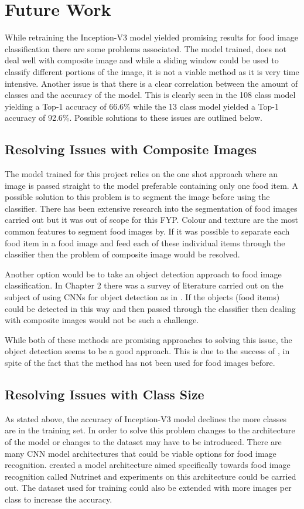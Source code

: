 

\section{Future Work}
While retraining the Inception-V3 model yielded promising results for food image classification there are some problems associated.
The model trained, does not deal well with composite image and while a sliding window could be used to classify different portions of the image, it is not a viable method as it is very time intensive.
Another issue is that there is a clear correlation between the amount of classes and the accuracy of the model.
This is clearly seen in the 108 class model yielding a Top-1 accuracy of 66.6\% while the 13 class model yielded a Top-1 accuracy of 92.6\%.
Possible solutions to these issues are outlined below.

\tocless\subsection{Resolving Issues with Composite Images}
The model trained for this project relies on the one shot approach where an image is passed straight to the model preferable containing only one food item.
A possible solution to this problem is to segment the image before using the classifier.
There has been extensive research into the segmentation of food images carried out but it was out of scope for this FYP.
Colour and texture are the most common features to segment food images by.
If it was possible to separate each food item in a food image and feed each of these individual items through the classifier then the problem of composite image would be resolved.

Another option would be to take an object detection approach to food image classification.
In Chapter 2 there was a survey of literature carried out on the subject of
using CNNs for object detection as in \parencite{maskRcnn}.
If the objects (food items) could be detected in this way and then passed through the classifier then dealing with composite images would not be such a challenge.

While both of these methods are promising approaches to solving this issue, the object detection seems to be a good approach. This is due to the success of \parencite{maskRcnn}, in spite of the fact that the method has not been used for food images before.

\tocless\subsection{Resolving Issues with Class Size}
As stated above, the accuracy of Inception-V3 model declines the more classes are in the training set.
In order to solve this problem changes to the architecture of the model or
changes to the dataset may have to be introduced.
There are many CNN model architectures that could be viable options for food image recognition.
\parencite{nutrinet} created a model architecture aimed specifically towards food image recognition called Nutrinet and experiments on this architecture could be carried out.
The dataset used for training could also be extended with more images per class to increase the accuracy.
